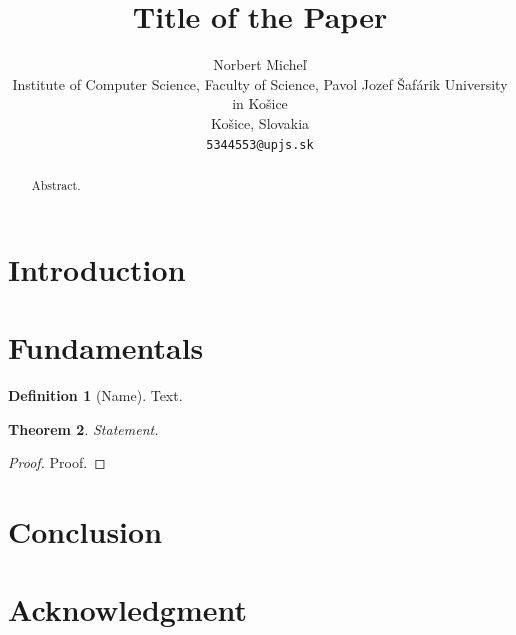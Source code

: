 \documentclass[journal]{new-aiaa}
\title{Title of the Paper}
\author{Norbert Micheľ\\
Institute of Computer Science, Faculty of Science, Pavol Jozef Šafárik University in Košice\\
Košice, Slovakia\\
\texttt{5344553@upjs.sk}}
\numberwithin{equation}{section}
\theoremstyle{definition}
\newtheorem{definition}{Definition}[section]
\theoremstyle{plain}
\newtheorem{theorem}[definition]{Theorem}
\theoremstyle{remark}
\begin{document}
\maketitle

\begin{abstract}
Abstract.
\end{abstract}

\section{Introduction}
\label{sec:introduction}

\section{Fundamentals}
\label{sec:fundamentals}

\begin{definition}[Name]
\label{def:name}
Text.
\end{definition}

\begin{theorem}
\label{thm:name}
Statement.
\end{theorem}

\begin{proof}
Proof.
\end{proof}

\section{Conclusion}
\label{sec:conclusion}

\section*{Acknowledgment}


\end{document}
